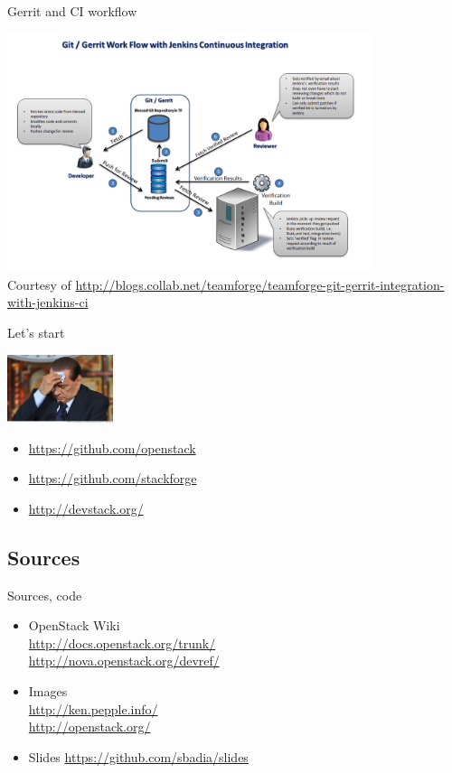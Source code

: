 \begin{frame}{Gerrit and CI workflow}
  \begin{center}
    \includegraphics[height=7cm]{img/Git_gerrit_jenkins.png}
    \\ \tiny Courtesy of \url{http://blogs.collab.net/teamforge/teamforge-git-gerrit-integration-with-jenkins-ci}
  \end{center}
\end{frame}

\begin{frame}{Let's start}
  \begin{center}
    \includegraphics[height=2cm]{img/silvio-berlusconi.jpg}
  \end{center}
  \begin{itemize}
    \item \url{https://github.com/openstack}
    \item \url{https://github.com/stackforge}
    \item \url{http://devstack.org/}
  \end{itemize}
\end{frame}

\subsection{Sources}
\begin{frame}{Sources, code}
\begin{itemize}
  \item OpenStack Wiki\\\url{http://docs.openstack.org/trunk/}\\\url{http://nova.openstack.org/devref/}
  \item Images\\\url{http://ken.pepple.info/}\\\url{http://openstack.org/}
  \item Slides \url{https://github.com/sbadia/slides}
\end{itemize}
\end{frame}
